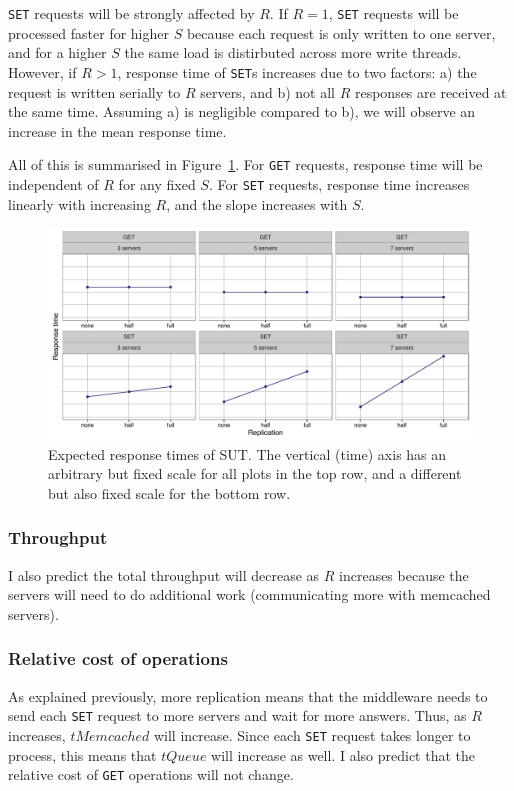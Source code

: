 \documentclass[11pt]{article}
\newcommand{\get}[0]{\texttt{GET}}
\newcommand{\set}[0]{\texttt{SET}}
\begin{document}
\set{} requests will be strongly affected by $R$. If $R=1$, \set{} requests will be processed faster for higher $S$ because each request is only written to one server, and for a higher $S$ the same load is distirbuted across more write threads. However, if $R>1$, response time of \set{}s increases due to two factors: a) the request is written serially to $R$ servers, and b) not all $R$ responses are received at the same time. Assuming a) is negligible compared to b), we will observe an increase in the mean response time.

All of this is summarised in Figure~\ref{fig:exp2:hyp:replication}. For \get{} requests, response time will be independent of $R$ for any fixed $S$. For \set{} requests, response time increases linearly with increasing $R$, and the slope increases with $S$.

\begin{figure}[h]
\centering
\includegraphics[width=\textwidth]{figures/hypothesis_replication.pdf}
\caption{Expected response times of SUT. The vertical (time) axis has an arbitrary but fixed scale for all plots in the top row, and a different but also fixed scale for the bottom row.}
\label{fig:exp2:hyp:replication}
\end{figure}


\subsubsection{Throughput}
I also predict the total throughput will decrease as $R$ increases because the servers will need to do additional work (communicating more with memcached servers).

\subsubsection{Relative cost of operations}
As explained previously, more replication means that the middleware needs to send each \set{} request to more servers and wait for more answers. Thus, as $R$ increases, $tMemcached$ will increase. Since each \set{} request takes longer to process, this means that $tQueue$ will increase as well. I also predict that the relative cost of \get{} operations will not change.
\end{document}

